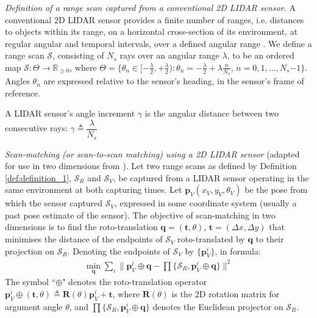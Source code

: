 \begin{definition}
  \label{def:definition_1}
  \textit{Definition of a range scan captured from a conventional 2D LIDAR
  sensor.} A conventional 2D LIDAR sensor provides a finite number of ranges,
  i.e. distances to objects within its range, on a horizontal cross-section of
  its environment, at regular angular and temporal intervals, over a defined
  angular range \cite{lidar}. We define a range scan $\mathcal{S}$, consisting
  of $N_s$ rays over an angular range $\lambda$, to be an ordered map
  $\mathcal{S} : \Theta \rightarrow \mathbb{R}_{\geq 0}$, where $\Theta =
  \{\theta_n \in [-\frac{\lambda}{2}, +\frac{\lambda}{2}) : \theta_n =
  -\frac{\lambda}{2} + \lambda \frac{n}{N_s}$, $n = 0,1,\dots, N_s$$-$$1$$\}$.
  Angles $\theta_n$ are expressed relative to the sensor's heading, in the
  sensor's frame of reference.
\end{definition}

\begin{definition}
  A LIDAR sensor's angle increment $\gamma$ is the angular distance between two
  consecutive rays: $\gamma \triangleq \dfrac{\lambda}{N_s}$
\end{definition}

\begin{definition}
  \label{def:definition_2}
  \textit{Scan-matching (or scan-to-scan matching) using a 2D LIDAR sensor} (adapted for use in
  two dimensions from \cite{plicp}).
  Let two range scans as defined by Definition \ref{def:definition_1},
  $\mathcal{S}_R$ and $\mathcal{S}_V$, be captured from a LIDAR
  sensor operating in the same environment at both capturing times. Let
  $\bm{p}_V(x_V,y_V,\theta_V)$ be the pose from
  which the sensor captured $\mathcal{S}_V$, expressed in some coordinate
  system (usually a past pose estimate of the sensor). The objective of
  scan-matching in two dimensions is to find the roto-translation
  $\bm{q} = (\bm{t}, \theta)$, $\bm{t} = (\Delta x, \Delta y)$ that minimises
  the distance of the endpoints of $\mathcal{S}_V$ roto-translated by
  $\bm{q}$ to their projection on $\mathcal{S}_R$. Denoting the
  endpoints of $\mathcal{S}_V$ by $\{\bm{p}_V^i\}$, in formula:
  \begin{align}
    \underset{\bm{q}}{\min} \sum\limits_i \Big\| \bm{p}_V^i \oplus \bm{q} - \prod \{ \mathcal{S}_R, \bm{p}_V^i \oplus \bm{q} \}\Big\|^2
    \label{eq:s2sm_def}
  \end{align}
  The symbol ``$\oplus$" denotes the roto-translation operator
  $\bm{p}_V^i \oplus (\bm{t}, \theta) \triangleq \bm{R}(\theta) \bm{p}^i_V + \bm{t}$,
  where $\bm{R}(\theta)$ is the 2D rotation matrix for argument angle $\theta$,
  and $\prod\{\mathcal{S}_R, \bm{p}_V^i \oplus \bm{q} \}$ denotes
  the Euclidean projector on $\mathcal{S}_R$.
\end{definition}


